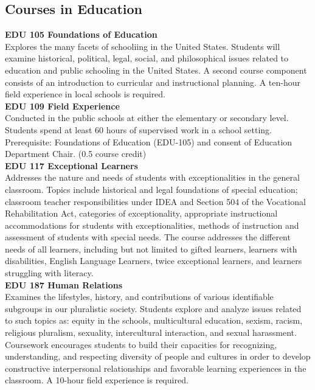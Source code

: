 \documentclass[
  letterpaper,
]{scrbook}
\begin{document}
\subsection{Courses in Education}\label{courses-in-education}

\textbf{EDU 105 Foundations of Education}\\
Explores the many facets of schooliing in the United States. Students
will examine historical, political, legal, social, and philosophical
issues related to education and public schooling in the United States. A
second course component consists of an introduction to curricular and
instructional planning. A ten-hour field experience in local schools is
required.\\
\textbf{EDU 109 Field Experience}\\
Conducted in the public schools at either the elementary or secondary
level. Students spend at least 60 hours of supervised work in a school
setting. Prerequisite: Foundations of Education (EDU-105) and consent of
Education Department Chair. (0.5 course credit)\\
\textbf{EDU 117 Exceptional Learners}\\
Addresses the nature and needs of students with exceptionalities in the
general classroom. Topics include historical and legal foundations of
special education; classroom teacher responsibilities under IDEA and
Section 504 of the Vocational Rehabilitation Act, categories of
exceptionality, appropriate instructional accommodations for students
with exceptionalities, methods of instruction and assessment of students
with special needs. The course addresses the different needs of all
learners, including but not limited to gifted learners, learners with
disabilities, English Language Learners, twice exceptional learners, and
learners struggling with literacy.\\
\textbf{EDU 187 Human Relations}\\
Examines the lifestyles, history, and contributions of various
identifiable subgroups in our pluralistic society. Students explore and
analyze issues related to such topics as: equity in the schools,
multicultural education, sexism, racism, religious pluralism, sexuality,
intercultural interaction, and sexual harassment. Coursework encourages
students to build their capacities for recognizing, understanding, and
respecting diversity of people and cultures in order to develop
constructive interpersonal relationships and favorable learning
experiences in the classroom. A 10-hour field experience is required.\\
\end{document}
